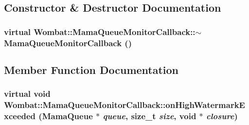 \subsection{Constructor \& Destructor Documentation}
\hypertarget{classWombat_1_1MamaQueueMonitorCallback_aef8c06407fa3cde05bbc52a21748b8c3}{
\subsubsection[{$\sim$MamaQueueMonitorCallback}]{\setlength{\rightskip}{0pt plus 5cm}virtual Wombat::MamaQueueMonitorCallback::$\sim$MamaQueueMonitorCallback ()}}
\label{classWombat_1_1MamaQueueMonitorCallback_aef8c06407fa3cde05bbc52a21748b8c3}


\subsection{Member Function Documentation}
\hypertarget{classWombat_1_1MamaQueueMonitorCallback_aed04cc6296cbd052724e2c390bc7c49c}{
\subsubsection[{onHighWatermarkExceeded}]{\setlength{\rightskip}{0pt plus 5cm}virtual void Wombat::MamaQueueMonitorCallback::onHighWatermarkExceeded ({\bf MamaQueue} $\ast$ {\em queue}, \/  size\_\-t {\em size}, \/  void $\ast$ {\em closure})}}
\label{classWombat_1_1MamaQueueMonitorCallback_aed04cc6296cbd052724e2c390bc7c49c}


